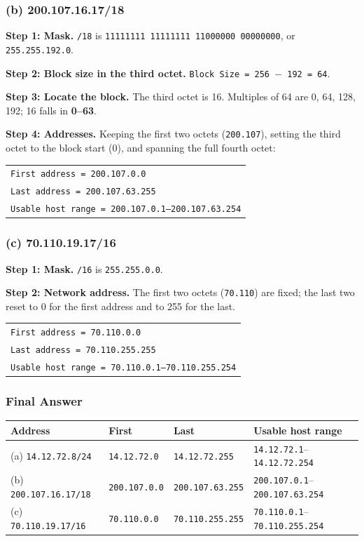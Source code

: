 \documentclass[11pt,a4paper]{article}
\begin{document}
\subsubsection*{(b) 200.107.16.17/18}

\textbf{Step 1: Mask.} \texttt{/18} is
\texttt{11111111 11111111 11000000 00000000}, or \texttt{255.255.192.0}.

\textbf{Step 2: Block size in the third octet.}
\texttt{Block Size = 256 $-$ 192 = 64}.

\textbf{Step 3: Locate the block.} The third octet is 16. Multiples of 64 are 0,
64, 128, 192; 16 falls in \textbf{0--63}.

\textbf{Step 4: Addresses.} Keeping the first two octets (\texttt{200.107}),
setting the third octet to the block start (0), and spanning the full fourth
octet:

\begin{tabularx}{\textwidth}{@{}X@{}}
\texttt{First address = 200.107.0.0} \\
\texttt{Last address = 200.107.63.255} \\
\texttt{Usable host range = 200.107.0.1--200.107.63.254} \\
\end{tabularx}

\subsubsection*{(c) 70.110.19.17/16}

\textbf{Step 1: Mask.} \texttt{/16} is \texttt{255.255.0.0}.

\textbf{Step 2: Network address.} The first two octets (\texttt{70.110}) are
fixed; the last two reset to 0 for the first address and to 255 for the last.

\begin{tabularx}{\textwidth}{@{}X@{}}
\texttt{First address = 70.110.0.0} \\
\texttt{Last address = 70.110.255.255} \\
\texttt{Usable host range = 70.110.0.1--70.110.255.254} \\
\end{tabularx}

\subsubsection*{Final Answer}

\begin{tabularx}{\textwidth}{@{}lllX@{}}
\toprule
\rowcolor{tablehead}\textbf{Address} & \textbf{First} & \textbf{Last} & \textbf{Usable host range} \\
\midrule
(a) \texttt{14.12.72.8/24} & \texttt{14.12.72.0} & \texttt{14.12.72.255} & \texttt{14.12.72.1}--\texttt{14.12.72.254} \\
(b) \texttt{200.107.16.17/18} & \texttt{200.107.0.0} & \texttt{200.107.63.255} & \texttt{200.107.0.1}--\texttt{200.107.63.254} \\
(c) \texttt{70.110.19.17/16} & \texttt{70.110.0.0} & \texttt{70.110.255.255} & \texttt{70.110.0.1}--\texttt{70.110.255.254} \\
\bottomrule
\end{tabularx}
\end{document}
